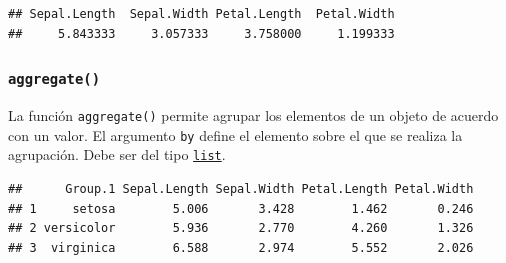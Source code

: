 \documentclass[]{book}
\newenvironment{Shaded}{\begin{snugshade}}{\end{snugshade}}
\newcommand{\KeywordTok}[1]{\textcolor[rgb]{0.13,0.29,0.53}{\textbf{#1}}}
\newcommand{\DataTypeTok}[1]{\textcolor[rgb]{0.13,0.29,0.53}{#1}}
\newcommand{\DecValTok}[1]{\textcolor[rgb]{0.00,0.00,0.81}{#1}}
\newcommand{\OperatorTok}[1]{\textcolor[rgb]{0.81,0.36,0.00}{\textbf{#1}}}
\newcommand{\NormalTok}[1]{#1}
\begin{document}
\begin{verbatim}
## Sepal.Length  Sepal.Width Petal.Length  Petal.Width 
##     5.843333     3.057333     3.758000     1.199333
\end{verbatim}

\subsubsection{\texorpdfstring{\texttt{aggregate()}}{aggregate()}}\label{l015aggregate}

La función \texttt{aggregate()} permite agrupar los elementos de un
objeto de acuerdo con un valor. El argumento \texttt{by} define el
elemento sobre el que se realiza la agrupación. Debe ser del tipo
\protect\hyperlink{l014list}{\texttt{list}}.

\begin{Shaded}
\end{Shaded}

\begin{verbatim}
##      Group.1 Sepal.Length Sepal.Width Petal.Length Petal.Width
## 1     setosa        5.006       3.428        1.462       0.246
## 2 versicolor        5.936       2.770        4.260       1.326
## 3  virginica        6.588       2.974        5.552       2.026
\end{verbatim}

\begin{Shaded}
\end{Shaded}
\end{document}
